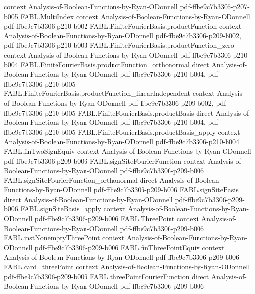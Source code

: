 \begin{theorem}
  {context}
  {Analysis-of-Boolean-Functions-by-Ryan-ODonnell}
  {pdf-ffbe9c7b3306-p207-b005}
\proofstep
  {FABL.MultiIndex}
  {context}
  {Analysis-of-Boolean-Functions-by-Ryan-ODonnell}
  {pdf-ffbe9c7b3306-p210-b002}
\proofstep
  {FABL.FiniteFourierBasis.productFunction}
  {context}
  {Analysis-of-Boolean-Functions-by-Ryan-ODonnell}
  {pdf-ffbe9c7b3306-p209-b002,
    pdf-ffbe9c7b3306-p210-b003}
\proofstep
  {FABL.FiniteFourierBasis.productFunction_zero}
  {context}
  {Analysis-of-Boolean-Functions-by-Ryan-ODonnell}
  {pdf-ffbe9c7b3306-p210-b004}
\proofstep
  {FABL.FiniteFourierBasis.productFunction_orthonormal}
  {direct}
  {Analysis-of-Boolean-Functions-by-Ryan-ODonnell}
  {pdf-ffbe9c7b3306-p210-b004,
    pdf-ffbe9c7b3306-p210-b005}
\proofstep
  {FABL.FiniteFourierBasis.productFunction_linearIndependent}
  {context}
  {Analysis-of-Boolean-Functions-by-Ryan-ODonnell}
  {pdf-ffbe9c7b3306-p209-b002,
    pdf-ffbe9c7b3306-p210-b005}
\proofstep
  {FABL.FiniteFourierBasis.productBasis}
  {direct}
  {Analysis-of-Boolean-Functions-by-Ryan-ODonnell}
  {pdf-ffbe9c7b3306-p210-b004,
    pdf-ffbe9c7b3306-p210-b005}
\proofstep
  {FABL.FiniteFourierBasis.productBasis_apply}
  {context}
  {Analysis-of-Boolean-Functions-by-Ryan-ODonnell}
  {pdf-ffbe9c7b3306-p210-b004}
\proofstep
  {FABL.finTwoSignEquiv}
  {context}
  {Analysis-of-Boolean-Functions-by-Ryan-ODonnell}
  {pdf-ffbe9c7b3306-p209-b006}
\proofstep
  {FABL.signSiteFourierFunction}
  {context}
  {Analysis-of-Boolean-Functions-by-Ryan-ODonnell}
  {pdf-ffbe9c7b3306-p209-b006}
\proofstep
  {FABL.signSiteFourierFunction_orthonormal}
  {direct}
  {Analysis-of-Boolean-Functions-by-Ryan-ODonnell}
  {pdf-ffbe9c7b3306-p209-b006}
\proofstep
  {FABL.signSiteBasis}
  {direct}
  {Analysis-of-Boolean-Functions-by-Ryan-ODonnell}
  {pdf-ffbe9c7b3306-p209-b006}
\proofstep
  {FABL.signSiteBasis_apply}
  {context}
  {Analysis-of-Boolean-Functions-by-Ryan-ODonnell}
  {pdf-ffbe9c7b3306-p209-b006}
\proofstep
  {FABL.ThreePoint}
  {context}
  {Analysis-of-Boolean-Functions-by-Ryan-ODonnell}
  {pdf-ffbe9c7b3306-p209-b006}
\proofstep
  {FABL.instNonemptyThreePoint}
  {context}
  {Analysis-of-Boolean-Functions-by-Ryan-ODonnell}
  {pdf-ffbe9c7b3306-p209-b006}
\proofstep
  {FABL.finThreePointEquiv}
  {context}
  {Analysis-of-Boolean-Functions-by-Ryan-ODonnell}
  {pdf-ffbe9c7b3306-p209-b006}
\proofstep
  {FABL.card_threePoint}
  {context}
  {Analysis-of-Boolean-Functions-by-Ryan-ODonnell}
  {pdf-ffbe9c7b3306-p209-b006}
\proofstep
  {FABL.threePointFourierFunction}
  {direct}
  {Analysis-of-Boolean-Functions-by-Ryan-ODonnell}
  {pdf-ffbe9c7b3306-p209-b006}

\end{theorem}

